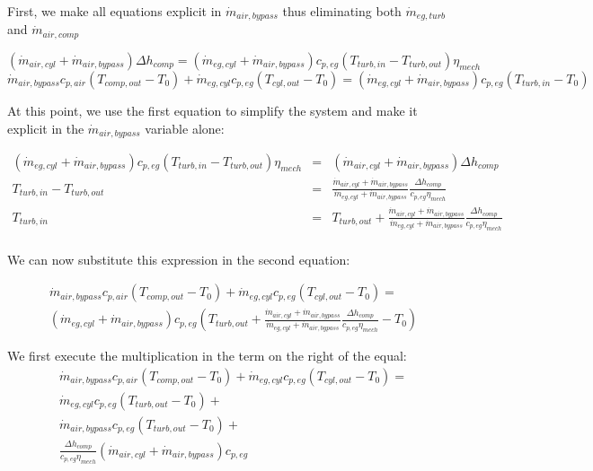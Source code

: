 \documentclass[preprint,12pt]{elsarticle}
\begin{document}
First, we make all equations explicit in $ \dot{m}_{air,bypass} $ thus eliminating both 
$ \dot{m}_{eg,turb} $ and $ \dot{m}_{air,comp} $

$$
(\dot{m}_{air,cyl} + \dot{m}_{air,bypass}) \Delta h_{comp} = (\dot{m}_{eg,cyl} + \dot{m}_{air,bypass}) c_{p,eg} (T_{turb,in} - T_{turb,out}) \eta_{mech} 
$$
$$
\dot{m}_{air,bypass} c_{p,air} (T_{comp,out} - T_0) + \dot{m}_{eg,cyl} c_{p,eg}  (T_{cyl,out} - T_0)  = (\dot{m}_{eg,cyl} + \dot{m}_{air,bypass}) c_{p,eg} (T_{turb,in} - T_0)
$$

At this point, we use the first equation to simplify the system and make it explicit in the $ \dot{m}_{air,bypass} $ variable alone:

\begin{eqnarray*}
	(\dot{m}_{eg,cyl} + \dot{m}_{air,bypass}) c_{p,eg} (T_{turb,in} - T_{turb,out}) \eta_{mech}  & = & (\dot{m}_{air,cyl} + \dot{m}_{air,bypass}) \Delta h_{comp} \\
	T_{turb,in} - T_{turb,out} & = & \frac{\dot{m}_{air,cyl} + \dot{m}_{air,bypass}}{\dot{m}_{eg,cyl} + \dot{m}_{air,bypass}} \frac{\Delta h_{comp}}{c_{p,eg} \eta_{mech}} \\
	T_{turb,in} & = & T_{turb,out} + \frac{\dot{m}_{air,cyl} + \dot{m}_{air,bypass}}{\dot{m}_{eg,cyl} + \dot{m}_{air,bypass}} \frac{\Delta h_{comp}}{c_{p,eg} \eta_{mech}}  \\
\end{eqnarray*}

We can now substitute this expression in the second equation:

\begin{multline}
\dot{m}_{air,bypass} c_{p,air} (T_{comp,out} - T_0) + \dot{m}_{eg,cyl} c_{p,eg}  (T_{cyl,out} - T_0)  =  \\ 
(\dot{m}_{eg,cyl} + \dot{m}_{air,bypass}) c_{p,eg} (T_{turb,out} + \frac{\dot{m}_{air,cyl} + \dot{m}_{air,bypass}}{\dot{m}_{eg,cyl} + \dot{m}_{air,bypass}} \frac{\Delta h_{comp}}{c_{p,eg} \eta_{mech}} - T_0)
\end{multline}


We first execute the multiplication in the term on the right of the equal:
\begin{multline}
\dot{m}_{air,bypass} c_{p,air} (T_{comp,out} - T_0) + \dot{m}_{eg,cyl} c_{p,eg}  (T_{cyl,out} - T_0)  =  \\
\dot{m}_{eg,cyl} c_{p,eg} (T_{turb,out} - T_0) + \\
\dot{m}_{air,bypass} c_{p,eg} (T_{turb,out} - T_0) + \\ 
\frac{\Delta h_{comp}}{c_{p,eg} \eta_{mech}}(\dot{m}_{air,cyl} + \dot{m}_{air,bypass}) c_{p,eg}
\end{multline}
\end{document}
